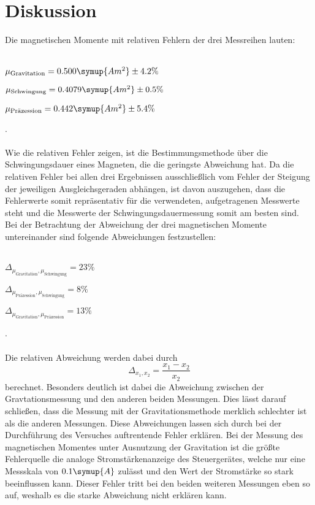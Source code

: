 \section{Diskussion}
\label{sec:Diskussion}
Die magnetischen Momente mit relativen Fehlern der drei Messreihen lauten:
\\ \\
\centerline{$\mu_\text{Gravitation} = 0.500 \symup{A m^2} \pm 4.2\% $ }
\centerline{$\mu_\text{Schwingung} =  0.4079 \symup{A m^2} \pm 0.5\% $}
\centerline{$\mu_\text{Präzession} = 0.442  \symup{A m^2} \pm 5.4\%$ }.
\\ \\
Wie die relativen Fehler zeigen, ist die Bestimmungsmethode über die Schwingungsdauer eines Magneten, die die geringste 
Abweichung hat. Da die relativen Fehler bei allen drei Ergebnissen ausschließlich vom Fehler der Steigung der jeweiligen
Ausgleichsgeraden abhängen, ist davon auszugehen, dass die Fehlerwerte somit repräsentativ für die verwendeten, aufgetragenen
Messwerte steht und die Messwerte der Schwingungsdauermessung somit am besten sind. 
Bei der Betrachtung der Abweichung der drei magnetischen Momente untereinander sind folgende Abweichungen festzustellen:
\\ \\
\centerline{$\Delta_\text{$\mu_\text{Gravitation}, \mu_\text{Schwingung}$} = 23 \%$}
\centerline{$\Delta_\text{$\mu_\text{Präzession}, \mu_\text{Schwingung}$} = 8 \%$}
\centerline{$\Delta_\text{$\mu_\text{Gravitation}, \mu_\text{Präzession}$} = 13 \%$}.
\\ \\
Die relativen Abweichung werden dabei durch 
\begin{equation}
    \Delta_\text{$x_1,x_2$} = \frac{x_1 - x_2}{x_2}
\end{equation}
berechnet. Besonders deutlich ist dabei die Abweichung zwischen der Gravtationsmessung und den anderen beiden Messungen. Dies lässt
darauf schließen, dass die Messung mit der Gravitationsmethode merklich schlechter ist als die anderen Messungen.
Diese Abweichungen lassen sich durch bei der Durchführung des Versuches auftrentende Fehler erklären.
Bei der Messung des magnetischen Momentes unter Ausnutzung der Gravitation ist die größte Fehlerquelle die analoge Stromstärkenanzeige
des Steuergerätes, welche nur eine Messskala von $0.1 \symup{A}$ zulässt und den Wert der Stromstärke so stark beeinflussen kann.
Dieser Fehler tritt bei den beiden weiteren Messungen eben so auf, weshalb es die starke Abweichung nicht erklären kann.
